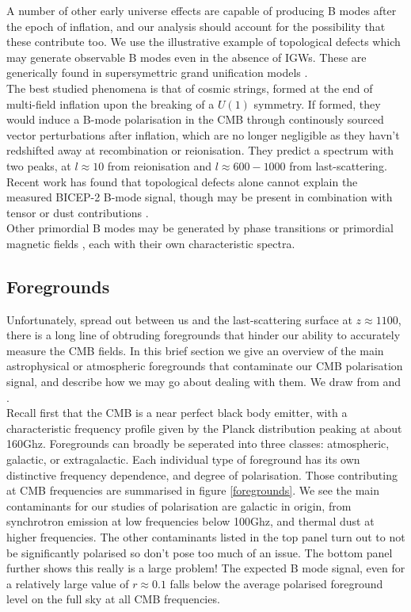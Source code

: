 \documentclass[a4paper,10pt]{article}
\begin{document}
A number of other early universe effects are capable of producing B modes after the epoch of inflation, and our analysis should account for the possibility that these contribute too. We use the illustrative example of topological defects which may generate observable B modes even in the absence of IGWs. These are generically found in supersymettric grand unification models \cite{CMBPol}.\\

The best studied phenomena is that of cosmic strings, formed at the end of multi-field inflation upon the breaking of a $U(1)$ symmetry. If formed, they would induce a B-mode polarisation in the CMB through continously sourced vector perturbations after inflation, which are no longer negligible as they havn't redshifted away at recombination or reionisation. They predict a spectrum with two peaks, at $l\approx10$ from reionisation and $l\approx 600-1000$ from last-scattering. Recent work has found that topological defects alone cannot explain the measured BICEP-2 B-mode signal, though may be present in combination with tensor or dust contributions \cite{baddefects}.\\

Other primordial B modes may be generated by phase transitions \cite{phase} or primordial magnetic fields \cite{magnetic}, each with their own characteristic spectra.

\subsection{Foregrounds}

Unfortunately, spread out between us and the last-scattering surface at $z\approx 1100$, there is a long line of obtruding foregrounds that hinder our ability to accurately measure the CMB fields. In this brief section we give an overview of the main astrophysical or atmospheric foregrounds that contaminate our CMB polarisation signal, and describe how we may go about dealing with them. We draw from \cite{thesis} and \cite{foregrounds}.\\

Recall first that the CMB is a near perfect black body emitter, with a characteristic frequency profile given by the Planck distribution peaking at about 160Ghz. Foregrounds can broadly be seperated into three classes: atmospheric, galactic, or extragalactic. Each individual type of foreground has its own distinctive frequency dependence, and degree of polarisation. Those contributing at CMB frequencies are summarised in figure \ref{foregrounds}. We see the main contaminants for our studies of polarisation are galactic in origin, from synchrotron emission at low frequencies below 100Ghz, and thermal dust at higher frequencies. The other contaminants listed in the top panel turn out to not be significantly polarised so don't pose too much of an issue. The bottom panel further shows this really is a large problem! The expected B mode signal, even for a relatively large value of $r\approx0.1$ falls below the average polarised foreground level on the full sky at all CMB frequencies.\\
\end{document}

